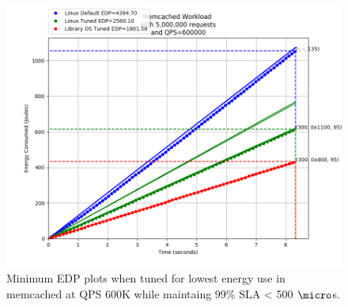 \documentclass[pageno]{jpaper}
\begin{document}
\begin{figure}
	\includegraphics[width=\columnwidth]{asplos2021_figures/mcd_edp_QPS600000.png}
	\caption{Minimum EDP plots when tuned for lowest energy use in memcached at QPS 600K while maintaing 99\% SLA < 500 $\micro$s.}
	\label{fig:mcd600K}
\end{figure}

\end{document}
